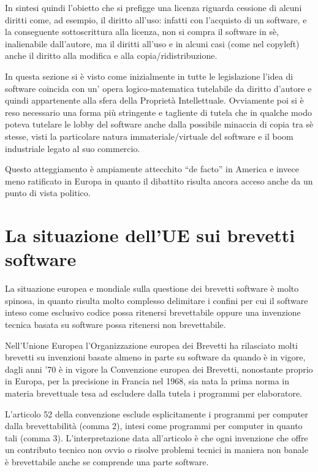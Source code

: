 In sintesi quindi l'obietto che si prefigge una licenza riguarda cessione di alcuni diritti come, ad esempio, il diritto all'uso: infatti con l'acquisto di un software, e la conseguente sottoscrittura alla licenza, non si compra il software in sè, inalienabile dall'autore, ma il diritti all'uso e in alcuni casi (come nel copyleft) anche il diritto alla modifica e alla copia/ridistribuzione.

In questa sezione si è visto come inizialmente in tutte le legislazione l'idea di software coincida con un' opera logico-matematica tutelabile da diritto d'autore e quindi appartenente alla sfera della Proprietà Intellettuale. Ovviamente poi si è reso necessario una forma più stringente e tagliente di tutela che in qualche modo poteva tutelare le lobby del software anche dalla possibile minaccia di copia tra sè stesse, visti la particolare natura immateriale/virtuale del software e il boom industriale legato al suo commercio.

Questo atteggiamento è ampiamente attecchito ``de facto'' in America e invece meno ratificato in Europa in quanto il dibattito risulta ancora acceso anche da un punto di vista politico.

\section{La situazione dell'UE sui brevetti software}
La situazione europea e mondiale sulla questione dei brevetti software è molto spinosa, in quanto risulta molto complesso delimitare i confini per cui il software inteso come esclusivo codice possa ritenersi brevettabile oppure una invenzione tecnica basata su software possa ritenersi non brevettabile.

Nell'Unione Europea l'Organizzazione europea dei Brevetti ha rilasciato molti brevetti su invenzioni basate almeno in parte su software da quando è in vigore, dagli anni '70 è in vigore la Convenzione europea dei Brevetti, nonostante proprio in Europa, per la precisione in Francia nel 1968, sia nata la prima norma in materia brevettuale tesa ad escludere dalla tutela i programmi per elaboratore.

L'articolo 52  della convenzione esclude esplicitamente i programmi per computer dalla brevettabilità (comma 2), intesi come programmi per computer in quanto tali (comma 3). L'interpretazione data all'articolo è che ogni invenzione che offre un contributo tecnico non ovvio o risolve problemi tecnici in maniera non banale è brevettabile anche se comprende una parte software.

